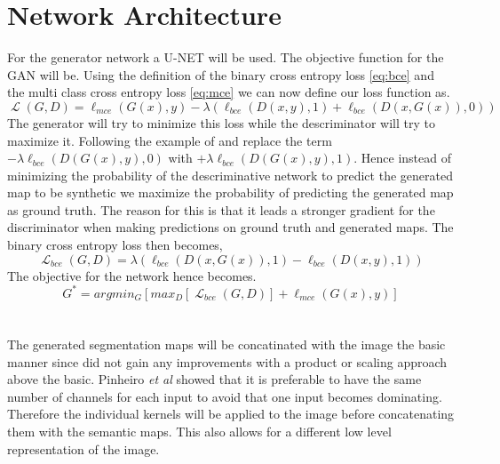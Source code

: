 \documentclass[a4paper,11pt]{article}
\DeclareMathOperator{\Lagr}{\mathcal{L}}
\begin{document}
\section{Network Architecture}
For the generator network a U-NET will be used. The objective function for the GAN will be.  Using the definition of the binary cross entropy loss \eqref{eq:bce} and the multi class cross entropy loss \eqref{eq:mce} we can now define our loss function as.
\begin{equation}
\Lagr(G, D) = \ell_{mce}(G(x),y)-\lambda(\ell_{bce}(D(x,y), 1)+\ell_{bce}(D(x,G(x)), 0))
\end{equation}
The generator will try to minimize this loss while the descriminator will try to maximize it. Following the example of \cite{goodfellow_generative_2014, luc_semantic_2016} and replace the term $-\lambda\ell_{bce}(D(G(x),y), 0)$ with  $+\lambda\ell_{bce}(D(G(x),y), 1)$. Hence instead of minimizing the probability of the descriminative network to predict the generated map to be synthetic we maximize the probability of predicting the generated map as ground truth. The reason for this is that it leads a stronger gradient for the discriminator when making predictions on ground truth and generated maps. The binary cross entropy loss then becomes,
\begin{equation}
\Lagr_{bce}(G, D) =\lambda(\ell_{bce}(D(x,G(x)), 1)-\ell_{bce}(D(x,y), 1))
\end{equation}
The objective for the network hence becomes.
\begin{equation}
G^{*}=argmin_{G}[max_{D}[\Lagr_{bce}(G, D)] + \ell_{mce}(G(x),y)]
\end{equation}
\\
\\
The generated segmentation maps will be concatinated with the image the basic manner since \cite{luc_semantic_2016} did not gain any improvements with a product or scaling approach above the basic. Pinheiro \textit{et al} \cite{pinheiro_learning_2016} showed that it is preferable to have the same number of channels for each input to avoid that one input becomes dominating. Therefore the individual kernels will be applied to the image before concatenating them with the semantic maps. This also allows for a different low level representation of the image.



\end{document}
